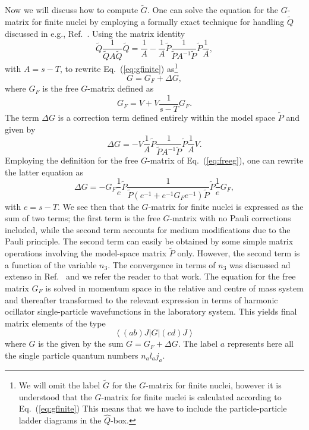 \documentclass[twoside,12pt]{article}
\newcommand{\bra}[1]{\left\langle #1 \right|}
\newcommand{\ket}[1]{\left| #1 \right\rangle}
\begin{document}
Now we will discuss how to compute $\tilde{G}$.
One can solve the equation for the $G$-matrix
for finite nuclei by employing
a formally
exact technique for handling $\tilde{Q}$
discussed in e.g., Ref.\ \cite{kkko76}.
Using the matrix identity
\begin{equation}
  \tilde{Q}\frac{1}{\tilde{Q}A\tilde{Q}}
  \tilde{Q}=\frac{1}{A}-
   \frac{1}{A}\tilde{P}\frac{1}{\tilde{P}A^{-1}\tilde{P}}\tilde{P}\frac{1}{A},
   \label{eq:matrix_relation_q}
\end{equation}
with $A=s -T$, to rewrite Eq.\ (\ref{eq:gfinite}) as\footnote{We will omit the
label $\tilde{G}$ for the $G$-matrix for finite nuclei, however it is
understood that the $G$-matrix for finite nuclei is calculated according
to Eq.\ (\ref{eq:gfinite}) This means that we have to
include the particle-particle ladder diagrams in the
$\hat{Q}$-box. }
\begin{equation}
   G = G_{F} +\Delta G,\label{eq:gmod}
\end{equation}
where $G_{F}$ is the free $G$-matrix defined as
\begin{equation}
   G_{F}=V+V\frac{1}{s - T}G_{F}. \label{eq:freeg}
\end{equation}
The term $\Delta G$ is a correction term defined entirely within the
model space $\tilde{P}$ and given by
\begin{equation}
   \Delta G =-V\frac{1}{A}\tilde{P}
   \frac{1}{\tilde{P}A^{-1}\tilde{P}}\tilde{P}\frac{1}{A}V.
\end{equation}
Employing the definition for the free $G$-matrix of Eq.\ (\ref{eq:freeg}),
one can rewrite the latter equation as
\begin{equation}
  \Delta G =-G_{F}\frac{1}{e}\tilde{P}
  \frac{1}{\tilde{P}(e^{-1}+e^{-1}G_{F}e^{-1})
  \tilde{P}}\tilde{P}\frac{1}{e}G_F,
\end{equation}
with $e=s -T$.
We see then that the $G$-matrix for finite nuclei
is expressed as the sum of two
terms; the first term is the free $G$-matrix with no Pauli corrections
included, while the second term accounts for medium modifications
due to the Pauli principle. The second term can easily
be obtained by some simple matrix operations involving
the model-space matrix $\tilde{P}$ only.
However, the second term is a function of the variable
$n_3$. The convergence in terms of $n_3$ was discussed ad extenso
in Ref.\ \cite{hko95} and we refer the reader to that work.
The equation for the free matrix $G_F$ is solved in momentum space in the
relative and centre of mass system and thereafter transformed to the
relevant expression in terms of harmonic ocillator single-particle
wavefunctions in the laboratory system. This yields final
matrix elements of the type
\begin{equation}
  \bra{(ab)J}G\ket{(cd)J}
\end{equation}
where $G$ is the given by the sum $G = G_{F} +\Delta G$.
The label $a$ represents here all the single particle quantum numbers
$n_{a}l_{a}j_{a}$.
\end{document}
